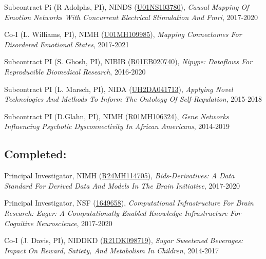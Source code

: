 Subcontract Pi (R Adolphs, PI), NINDS (\href{http://projectreporter.nih.gov/project_info_description.cfm?aid=9830084}{U01NS103780}), \textit{Causal Mapping Of Emotion Networks With Concurrent Electrical Stimulation And Fmri}, 2017-2020 \vspace{2mm}

Co-I (L. Williams, PI), NIMH (\href{https://projectreporter.nih.gov/project_info_description.cfm?aid=9925811}{U01MH109985}), \textit{Mapping Connectomes For Disordered Emotional States}, 2017-2021 \vspace{2mm}

Subcontract PI (S. Ghosh, PI), NIBIB (\href{https://projectreporter.nih.gov/project_info_description.cfm?aid=9603723}{R01EB020740}), \textit{Nipype: Dataflows For Reproducible Biomedical Research}, 2016-2020 \vspace{2mm}

Subcontract PI (L. Marsch, PI), NIDA (\href{http://projectreporter.nih.gov/project_info_description.cfm?aid=9310428}{UH2DA041713}), \textit{Applying Novel Technologies And Methods To Inform The Ontology Of Self-Regulation}, 2015-2018 \vspace{2mm}

Subcontract PI (D.Glahn, PI), NIMH (\href{http://projectreporter.nih.gov/project_info_description.cfm?aid=9634110}{R01MH106324}), \textit{Gene Networks Influencing Psychotic Dysconnectivity In African Americans}, 2014-2019 \vspace{2mm}

\subsection*{Completed:}

Principal Investigator, NIMH (\href{http://projectreporter.nih.gov/project_info_description.cfm?aid=9566304}{R24MH114705}), \textit{Bids-Derivatives: A Data Standard For Derived Data And Models In The Brain Initiative}, 2017-2020 \vspace{2mm}

Principal Investigator, NSF (\href{http://www.nsf.gov/awardsearch/showAward?AWD_ID=1649658&HistoricalAwards=false}{1649658}), \textit{Computational Infrastructure For Brain Research: Eager: A Computationally Enabled Knowledge Infrastructure For Cognitive Neuroscience}, 2017-2020 \vspace{2mm}

Co-I (J. Davis, PI), NIDDKD (\href{http://projectreporter.nih.gov/project_info_description.cfm?aid=8829825}{R21DK098719}), \textit{Sugar Sweetened Beverages: Impact On Reward, Satiety, And Metabolism In Children}, 2014-2017 \vspace{2mm}

